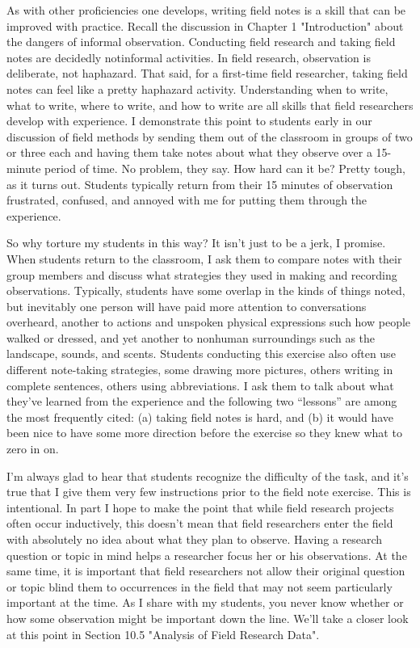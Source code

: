 As with other proficiencies one develops, writing field notes is a skill that can be improved with practice. Recall the discussion in Chapter 1 "Introduction" about the dangers of informal observation. Conducting field research and taking field notes are decidedly notinformal activities. In field research, observation is deliberate, not haphazard. That said, for a first-time field researcher, taking field notes can feel like a pretty haphazard activity. Understanding when to write, what to write, where to write, and how to write are all skills that field researchers develop with experience. I demonstrate this point to students early in our discussion of field methods by sending them out of the classroom in groups of two or three each and having them take notes about what they observe over a 15-minute period of time. No problem, they say. How hard can it be? Pretty tough, as it turns out. Students typically return from their 15 minutes of observation frustrated, confused, and annoyed with me for putting them through the experience.

So why torture my students in this way? It isn’t just to be a jerk, I promise. When students return to the classroom, I ask them to compare notes with their group members and discuss what strategies they used in making and recording observations. Typically, students have some overlap in the kinds of things noted, but inevitably one person will have paid more attention to conversations overheard, another to actions and unspoken physical expressions such how people walked or dressed, and yet another to nonhuman surroundings such as the landscape, sounds, and scents. Students conducting this exercise also often use different note-taking strategies, some drawing more pictures, others writing in complete sentences, others using abbreviations. I ask them to talk about what they’ve learned from the experience and the following two “lessons” are among the most frequently cited: (a) taking field notes is hard, and (b) it would have been nice to have some more direction before the exercise so they knew what to zero in on.

I’m always glad to hear that students recognize the difficulty of the task, and it’s true that I give them very few instructions prior to the field note exercise. This is intentional. In part I hope to make the point that while field research projects often occur inductively, this doesn’t mean that field researchers enter the field with absolutely no idea about what they plan to observe. Having a research question or topic in mind helps a researcher focus her or his observations. At the same time, it is important that field researchers not allow their original question or topic blind them to occurrences in the field that may not seem particularly important at the time. As I share with my students, you never know whether or how some observation might be important down the line. We’ll take a closer look at this point in Section 10.5 "Analysis of Field Research Data".

